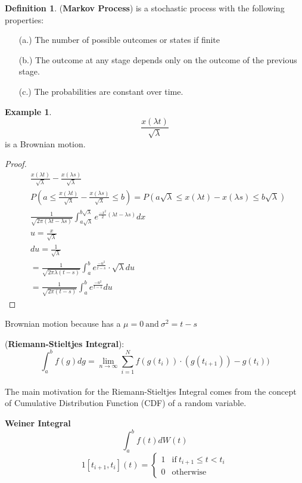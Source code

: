 \documentclass[12pt,letterpaper]{amsart}
\theoremstyle{plain}
\theoremstyle{definition}
\newtheorem{definition}[theorem]{Definition}
\newtheorem{example}[theorem]{Example}
\numberwithin{equation}{section}
\begin{document}
\begin{definition}(\textbf{Markov Process}) is a stochastic process with the following properties: 
\begin{enumerate}
\item[(a.)] The number of possible outcomes or states if finite
\item[(b.)] The outcome at any stage depends only on the outcome of the previous stage.
\item[(c.)] The probabilities are constant over time.   
\end{enumerate}

\begin{example}
$$ \frac{x(\lambda t)}{\sqrt{\lambda}}$$ is a Brownian motion. 
\begin{proof}
\begin{align*}
 & \frac{x(\lambda t)}{\sqrt{\lambda}}-\frac{x(\lambda s)}{\sqrt{\lambda}}\\
 & P \left(a \leq \frac{x(\lambda t)}{\sqrt{\lambda}}-\frac{x(\lambda s)}{\sqrt{\lambda}} \leq b \right)=P \left(a \sqrt{\lambda} \leq x(\lambda t) - x (\lambda s) \leq b \sqrt{\lambda} \right)\\
 & \displaystyle \frac{1}{\sqrt{2 \pi (\lambda t -\lambda s)}} \int_{a \sqrt{\lambda}}^{b \sqrt{\lambda}} e^{\frac{-x^2}{2}(\lambda t- \lambda s)} dx\\
  & u=\frac{x}{\sqrt{\lambda}}\\
  & du=\frac{1}{\sqrt{\lambda}}\\
  & =\frac{1}{\sqrt{2 \pi \lambda(t-s)}} \int_{a}^{b} e^{\frac{-u^2}{t-s}} \cdot \sqrt{\lambda}du\\
  & = \frac{1}{\sqrt{2 \pi (t-s)}} \int_{a}^{b} e^{\frac{-u^2}{t-s}}du
 \end{align*}
 \end{proof}

Brownian motion because has a $\mu=0 \ \text{and} \ \sigma^2=t-s$
\end{example}

\end{definition}

(\textbf{Riemann-Stieltjes Integral}): 
$$\displaystyle \int_{a}^{b} f(g)dg= \underset{n \to \infty}{\lim} \sum_{i=1}^{N} f(g(t_i)) \cdot (g(t_{i+1}))- g(t_i))$$\\

The main motivation for the Riemann-Stieltjes Integral comes from the concept of Cumulative Distribution Function (CDF) of a random variable. 

\textbf{Weiner Integral} $$\int_{a}^{b} f(t)dW(t)$$
$$1[t_{i+1}, t_i] (t)= \begin{cases} 1 & \text{if} \ t_{i+1} \leq t < t_i \\
0 & \text{otherwise} \end{cases}$$
\end{document}
